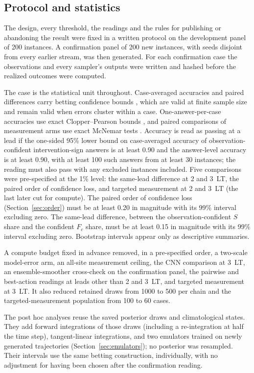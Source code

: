 \documentclass[11pt]{article}
\begin{document}
\subsection{Protocol and statistics}
\label{sec:protocol}
The design, every threshold, the readings and the rules for publishing or abandoning the result were fixed in a written protocol on the development panel of 200 instances. A confirmation panel of 200 new instances, with seeds disjoint from every earlier stream, was then generated. For each confirmation case the observations and every sampler's outputs were written and hashed before the realized outcomes were computed.

The case is the statistical unit throughout. Case-averaged accuracies and paired differences carry betting confidence bounds \citep{waudbysmith2024estimating}, which are valid at finite sample size and remain valid when errors cluster within a case. One-answer-per-case accuracies use exact Clopper--Pearson bounds \citep{clopper1934use}, and paired comparisons of measurement arms use exact McNemar tests \citep{mcnemar1947note}. Accuracy is read as passing at a lead if the one-sided 95\% lower bound on case-averaged accuracy of observation-confident intervention-sign answers is at least 0.90 and the answer-level accuracy is at least 0.90, with at least 100 such answers from at least 30 instances; the reading must also pass with any excluded instances included. Five comparisons were pre-specified at the 1\% level: the same-lead difference at 2 and 3~LT, the paired order of confidence loss, and targeted measurement at 2 and 3~LT (the last later cut for compute). The paired order of confidence loss (Section~\ref{sec:order}) must be at least 0.20 in magnitude with its 99\% interval excluding zero. The same-lead difference, between the observation-confident $S$ share and the confident $F_c$ share, must be at least 0.15 in magnitude with its 99\% interval excluding zero. Bootstrap intervals appear only as descriptive summaries.

A compute budget fixed in advance removed, in a pre-specified order, a two-scale model-error arm, an all-site measurement ceiling, the CNN comparison at 3~LT, an ensemble-smoother cross-check on the confirmation panel, the pairwise and best-action readings at leads other than 2 and 3~LT, and targeted measurement at 3~LT. It also reduced retained draws from 1000 to 500 per chain and the targeted-measurement population from 100 to 60 cases.

The post hoc analyses reuse the saved posterior draws and climatological states. They add forward integrations of those draws (including a re-integration at half the time step), tangent-linear integrations, and two emulators trained on newly generated trajectories (Section~\ref{sec:emulators}); no posterior was resampled. Their intervals use the same betting construction, individually, with no adjustment for having been chosen after the confirmation reading.
\end{document}
